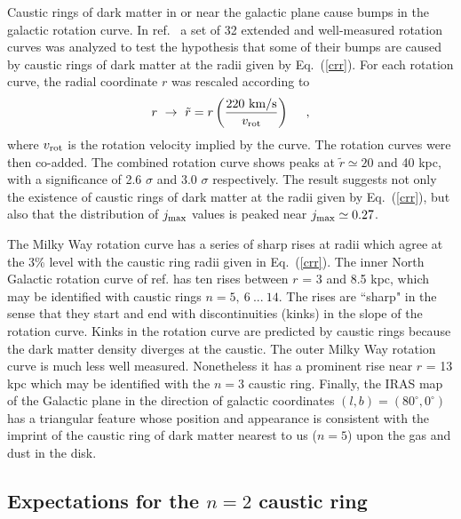 \documentclass[aps,prd,preprint,tightenlines,floatfix,showpacs,groupedaddress]{revtex4}
\begin{document}
Caustic rings of dark matter in or near the galactic plane cause bumps 
in the galactic rotation curve.  In ref.~\cite{Kinn} a set of 32 extended
and well-measured rotation curves was analyzed to test the hypothesis that 
some of their bumps are caused by caustic rings of dark matter at the radii 
given by Eq.~(\ref{crr}).  For each rotation curve, the radial coordinate
$r$ was rescaled according to 
\begin{equation}
r~\rightarrow~\tilde {r} = r
\left({220~{\rm km/s} \over v_{\rm rot}}\right)~~~\ ,
\label{resc}
\end{equation}
where $v_{\rm rot}$ is the rotation velocity implied by the curve. The 
rotation curves were then co-added.  The combined rotation curve shows 
peaks at $\tilde{r} \simeq 20$ and 40 kpc, with a significance of 
2.6 $\sigma$ and 3.0 $\sigma$ respectively.  The result suggests 
not only the existence of caustic rings of dark matter at the 
radii given by Eq.~(\ref{crr}), but also that the distribution of 
$j_{\rm max}$ values is peaked near $j_{\rm max} \simeq 0.27$.  

The Milky Way rotation curve has a series of sharp rises at radii 
which agree at the 3\% level \cite{milk} with the caustic ring 
radii given in Eq.~(\ref{crr}).  The inner North Galactic rotation 
curve of ref. \cite{Clem} has ten rises between $r$ = 3 and 8.5 kpc, 
which may be identified with caustic rings $n = 5,~6~...~14$.  
The rises are ``sharp" in the sense that they start and end with
discontinuities (kinks) in the slope of the rotation curve.  Kinks 
in the rotation curve are predicted by caustic rings because the 
dark matter density diverges at the caustic.  The outer Milky Way 
rotation curve is much less well measured.  Nonetheless it has a 
prominent rise near $r$ = 13 kpc which may be identified with the 
$n = 3$ caustic ring.  Finally, the IRAS map of the Galactic plane 
in the direction of galactic coordinates $(l,b) = (80^\circ, 0^\circ)$ 
has a triangular feature whose position and appearance is consistent 
with the imprint of the caustic ring of dark matter nearest to us 
($n = 5$) upon the gas and dust in the disk.

\subsection{Expectations for the $n=2$ caustic ring}
\end{document}
